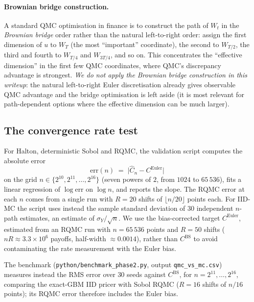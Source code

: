 \documentclass[11pt,a4paper]{article}
\theoremstyle{plain}
\theoremstyle{definition}
\theoremstyle{remark}
\begin{document}
\paragraph{Brownian bridge construction.} A standard QMC
optimisation in finance is to construct the path of $W_t$ in the
\emph{Brownian bridge} order rather than the natural left-to-right
order: assign the first dimension of $u$ to $W_T$ (the most
``important'' coordinate), the second to $W_{T/2}$, the third and
fourth to $W_{T/4}$ and $W_{3T/4}$, and so on. This concentrates the
``effective dimension'' in the first few QMC coordinates, where
QMC's discrepancy advantage is strongest. \emph{We do not apply
the Brownian bridge construction in this writeup}: the natural
left-to-right Euler discretisation already gives observable QMC
advantage and the bridge optimisation is left aside
(it is most relevant for path-dependent options where the
effective dimension can be much larger).

\subsection{The convergence rate test}
\label{sec:conv-test}

For Halton, deterministic Sobol and RQMC, the validation script
computes the absolute error
\begin{equation}
\mathrm{err}(n) \;=\; \bigl|\hat C_n - C^{\mathrm{Euler}}\bigr|
\end{equation}
on the grid $n \in \{2^{10}, 2^{11}, \ldots, 2^{16}\}$ (seven powers
of $2$, from $1024$ to $65\,536$), fits a linear regression of
$\log \mathrm{err}$ on $\log n$, and reports the slope. The RQMC
error at each $n$ comes from a single run with $R = 20$ shifts of
$\lfloor n/20 \rfloor$ points each. For IID-MC the script uses
instead the sample standard deviation of $30$ independent $n$-path
estimates, an estimate of $\sigma_Y / \sqrt n$. We use the
bias-corrected target $C^{\mathrm{Euler}}$, estimated from an RQMC
run with $n = 65\,536$ points and $R = 50$ shifts
($nR \approx 3.3 \times 10^6$ payoffs, half-width $\approx 0.0014$),
rather than $C^{\mathrm{BS}}$ to avoid contaminating the rate
measurement with the Euler bias.

The benchmark (\texttt{python/benchmark\_phase2.py}, output
\texttt{qmc\_vs\_mc.csv}) measures instead the RMS error over $30$
seeds against $C^{\mathrm{BS}}$, for $n = 2^{11}, \ldots, 2^{16}$,
comparing the exact-GBM IID pricer with Sobol RQMC ($R = 16$ shifts
of $n/16$ points); its RQMC error therefore includes the Euler bias.
\end{document}
